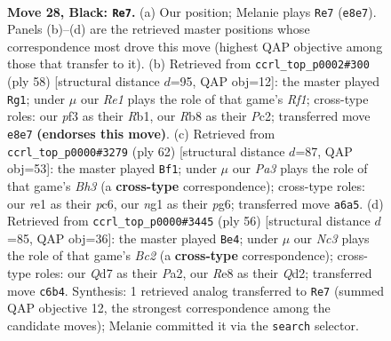 \documentclass[11pt]{article}
\begin{document}
\clearpage

\begin{figure}[p]\centering
\begin{subfigure}{0.46\textwidth}\centering
\resizebox{\linewidth}{!}{%
\newchessgame
\chessboard[
  setfen={1rb1rk2/3q1P1p/ppn5/2p1p1p1/P3Q3/2P2P2/6PP/1KN1RBNR b - - 0 28},
  showmover=false,
  pgfstyle=straightmove, color=movearrow, markmove={e8-e7}
]}
\caption{}
\end{subfigure}\hfill
\begin{subfigure}{0.46\textwidth}\centering
\resizebox{\linewidth}{!}{%
\newchessgame
\chessboard[
  setfen={1r1b2k1/1p3q2/p1n4r/P2Np1pP/4Pp2/2B2P2/2P2Q1P/1R3R1K w - - 2 30},
  showmover=false,
  pgfstyle=straightmove, color=movearrow, markmove={f1-g1}
]}
\caption{}
\end{subfigure}
\\[4pt]
\begin{subfigure}{0.46\textwidth}\centering
\resizebox{\linewidth}{!}{%
\newchessgame
\chessboard[
  setfen={3r1nnk/p1r3b1/1pp3pp/8/1PqPQP2/P1N2R1B/5B1P/6RK w - - 3 32},
  showmover=false,
  pgfstyle=straightmove, color=movearrow, markmove={h3-f1}
]}
\caption{}
\end{subfigure}\hfill
\begin{subfigure}{0.46\textwidth}\centering
\resizebox{\linewidth}{!}{%
\newchessgame
\chessboard[
  setfen={1r1r3k/5p1p/5pn1/p1bP1N2/1pp2q2/7P/PPBQRPP1/1R4K1 w - - 0 29},
  showmover=false,
  pgfstyle=straightmove, color=movearrow, markmove={c2-e4}
]}
\caption{}
\end{subfigure}
\caption{\textbf{Move 28, Black: \texttt{Re7}.} (a) Our position; Melanie plays \texttt{Re7} (\texttt{e8e7}). Panels (b)--(d) are the retrieved master positions whose correspondence most drove this move (highest QAP objective among those that transfer to it). (b) Retrieved from \texttt{ccrl\_top\_p0002\#300} (ply 58) [structural distance $d$=95, QAP obj=12]: the master played \texttt{Rg1}; under $\mu$ our \emph{Re1} plays the role of that game's \emph{Rf1}; cross-type roles: our \emph{p}f3 as their \emph{R}b1, our \emph{R}b8 as their \emph{P}c2; transferred move \texttt{e8e7} \textbf{(endorses this move)}. (c) Retrieved from \texttt{ccrl\_top\_p0000\#3279} (ply 62) [structural distance $d$=87, QAP obj=53]: the master played \texttt{Bf1}; under $\mu$ our \emph{Pa3} plays the role of that game's \emph{Bh3} (a \textbf{cross-type} correspondence); cross-type roles: our \emph{r}e1 as their \emph{p}c6, our \emph{n}g1 as their \emph{p}g6; transferred move \texttt{a6a5}. (d) Retrieved from \texttt{ccrl\_top\_p0000\#3445} (ply 56) [structural distance $d$=85, QAP obj=36]: the master played \texttt{Be4}; under $\mu$ our \emph{Nc3} plays the role of that game's \emph{Bc2} (a \textbf{cross-type} correspondence); cross-type roles: our \emph{Q}d7 as their \emph{P}a2, our \emph{R}e8 as their \emph{Q}d2; transferred move \texttt{c6b4}. Synthesis: 1 retrieved analog transferred to \texttt{Re7} (summed QAP objective 12, the strongest correspondence among the candidate moves); Melanie committed it via the \texttt{search} selector.}
\label{fig:thought-m55}
\end{figure}
\end{document}
